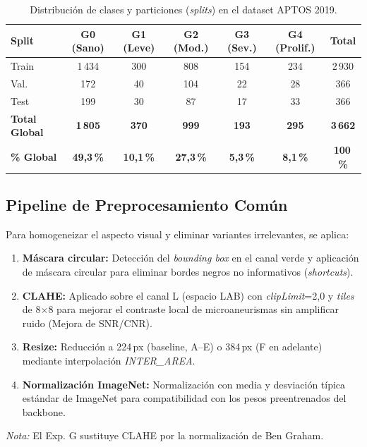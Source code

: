 \documentclass[12pt, a4paper]{article}
\begin{document}
\begin{table}[h!]
\centering
\small
\caption{Distribución de clases y particiones (\textit{splits}) en el dataset APTOS 2019.}
\label{tab:distribucion_aptos}
\begin{tabular}{lcccccc}
\toprule
\textbf{Split} & \textbf{G0 (Sano)} & \textbf{G1 (Leve)} & \textbf{G2 (Mod.)} & \textbf{G3 (Sev.)} & \textbf{G4 (Prolif.)} & \textbf{Total} \\ \midrule
Train & 1\,434 & 300 & 808 & 154 & 234 & 2\,930 \\
Val.  & 172    & 40  & 104 & 22  & 28  & 366    \\
Test  & 199    & 30  & 87  & 17  & 33  & 366    \\ \midrule
\textbf{Total Global} & \textbf{1\,805} & \textbf{370} & \textbf{999} & \textbf{193} & \textbf{295} & \textbf{3\,662} \\
\textbf{\% Global} & \textbf{49,3\,\%} & \textbf{10,1\,\%} & \textbf{27,3\,\%} & \textbf{5,3\,\%} & \textbf{8,1\,\%} & \textbf{100\,\%} \\ \bottomrule
\end{tabular}
\end{table}

\subsection{Pipeline de Preprocesamiento Común}
Para homogeneizar el aspecto visual y eliminar variantes irrelevantes, se aplica:
\begin{enumerate}
    \item \textbf{Máscara circular:} Detección del \textit{bounding box} en el canal verde y aplicación de máscara circular para eliminar bordes negros no informativos (\textit{shortcuts}).
    \item \textbf{CLAHE:} Aplicado sobre el canal L (espacio LAB) con \textit{clipLimit}=2,0 y \textit{tiles} de 8$\times$8 para mejorar el contraste local de microaneurismas sin amplificar ruido (Mejora de SNR/CNR).
    \item \textbf{Resize:} Reducción a 224\,px (baseline, A--E) o 384\,px (F en adelante) mediante interpolación \textit{INTER\_AREA}.
    \item \textbf{Normalización ImageNet:} Normalización con media y desviación típica estándar de ImageNet para compatibilidad con los pesos preentrenados del backbone.
\end{enumerate}
\textit{Nota:} El Exp. G sustituye CLAHE por la normalización de Ben Graham.
\end{document}
